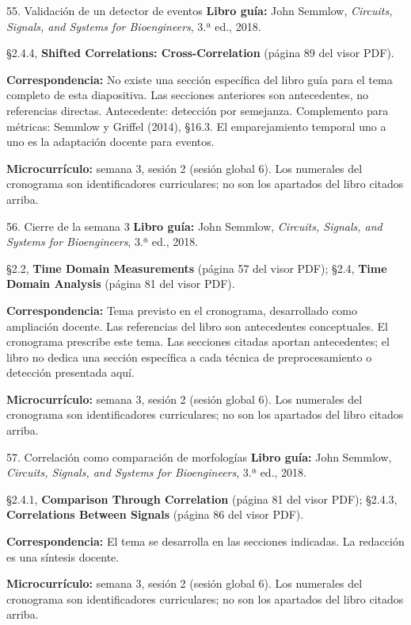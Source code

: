 \documentclass[
  10pt,
  ignorenonframetext,
  aspectratio=169,
  spanish,
]{beamer}
\begin{document}
\begin{frame}{55. Validación de un detector de eventos}
\label{validaciuxf3n-de-un-detector-de-eventos}
\textbf{Libro guía:} John Semmlow, \emph{Circuits, Signals, and Systems
for Bioengineers}, 3.ª ed., 2018.

§2.4.4, \textbf{Shifted Correlations: Cross-Correlation} (página 89 del
visor PDF).

\textbf{Correspondencia:} No existe una sección específica del libro
guía para el tema completo de esta diapositiva. Las secciones anteriores
son antecedentes, no referencias directas. Antecedente: detección por
semejanza. Complemento para métricas: Semmlow y Griffel (2014), §16.3.
El emparejamiento temporal uno a uno es la adaptación docente para
eventos.

\textbf{Microcurrículo:} semana 3, sesión 2 (sesión global 6). Los
numerales del cronograma son identificadores curriculares; no son los
apartados del libro citados arriba.
\end{frame}

\begin{frame}{56. Cierre de la semana 3}
\label{cierre-de-la-semana-3}
\textbf{Libro guía:} John Semmlow, \emph{Circuits, Signals, and Systems
for Bioengineers}, 3.ª ed., 2018.

§2.2, \textbf{Time Domain Measurements} (página 57 del visor PDF); §2.4,
\textbf{Time Domain Analysis} (página 81 del visor PDF).

\textbf{Correspondencia:} Tema previsto en el cronograma, desarrollado
como ampliación docente. Las referencias del libro son antecedentes
conceptuales. El cronograma prescribe este tema. Las secciones citadas
aportan antecedentes; el libro no dedica una sección específica a cada
técnica de preprocesamiento o detección presentada aquí.

\textbf{Microcurrículo:} semana 3, sesión 2 (sesión global 6). Los
numerales del cronograma son identificadores curriculares; no son los
apartados del libro citados arriba.
\end{frame}

\begin{frame}{57. Correlación como comparación de morfologías}
\label{correlaciuxf3n-como-comparaciuxf3n-de-morfologuxedas}
\textbf{Libro guía:} John Semmlow, \emph{Circuits, Signals, and Systems
for Bioengineers}, 3.ª ed., 2018.

§2.4.1, \textbf{Comparison Through Correlation} (página 81 del visor
PDF); §2.4.3, \textbf{Correlations Between Signals} (página 86 del visor
PDF).

\textbf{Correspondencia:} El tema se desarrolla en las secciones
indicadas. La redacción es una síntesis docente.

\textbf{Microcurrículo:} semana 3, sesión 2 (sesión global 6). Los
numerales del cronograma son identificadores curriculares; no son los
apartados del libro citados arriba.
\end{frame}
\end{document}
